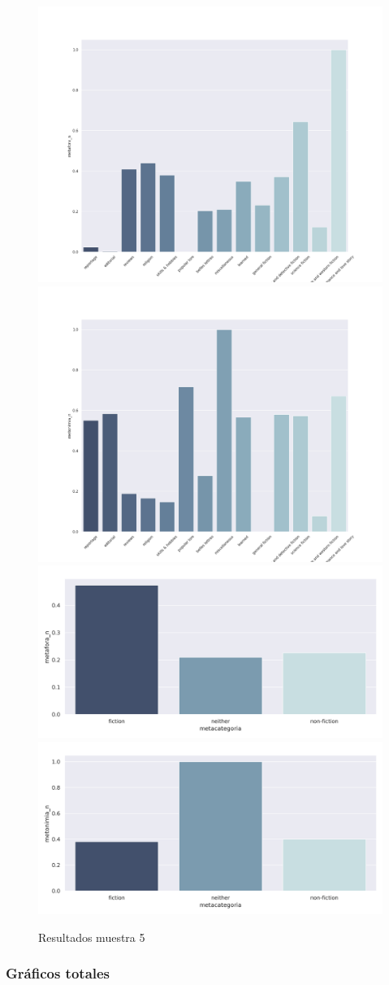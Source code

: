 \documentclass[twoside]{article}
\begin{document}
\begin{figure}[!H]
\centering
\includegraphics[width=.45\linewidth]{./resultados/graphs/muestra/c5_metafora.png}
\includegraphics[width=.45\linewidth]{./resultados/graphs/muestra/c5_metonimia.png}
\includegraphics[width=.45\linewidth]{./resultados/graphs/meta/c5_metacategoria_metafora.png}
\includegraphics[width=.45\linewidth]{./resultados/graphs/meta/c5_metacategoria_metonimia.png}
\caption{\label{fig:c5_resultados}Resultados muestra 5}
\end{figure}


\subsubsection{Gráficos totales}
\label{sec:orge313197}
\end{document}
